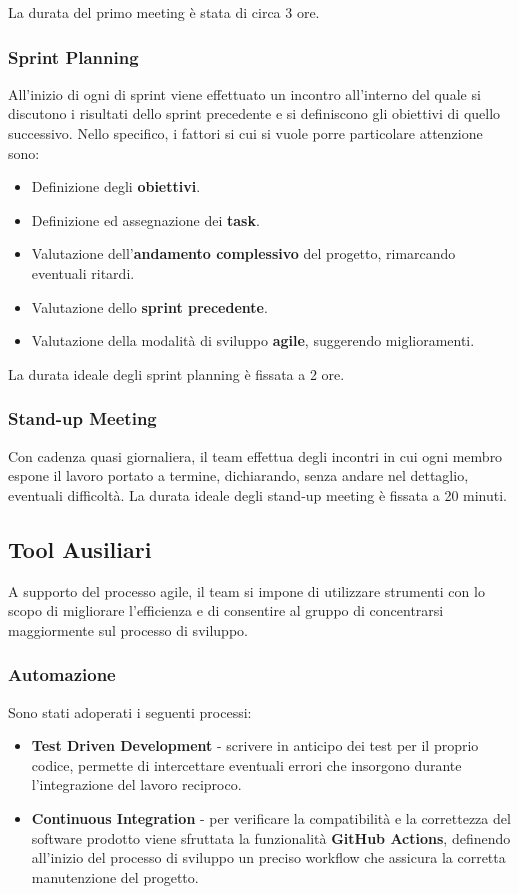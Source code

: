 La durata del primo meeting è stata di circa 3 ore.

\subsubsection{Sprint Planning}
All'inizio di ogni di sprint viene effettuato un incontro all'interno del quale si discutono i risultati dello sprint precedente e si definiscono gli obiettivi di quello successivo. Nello specifico, i fattori si cui si vuole porre particolare attenzione sono:
\begin{itemize}
    \item Definizione degli \textbf{obiettivi}.
    \item Definizione ed assegnazione dei \textbf{task}.
    \item Valutazione dell'\textbf{andamento complessivo} del progetto, rimarcando eventuali ritardi.
    \item Valutazione dello \textbf{sprint precedente}.
    \item Valutazione della modalità di sviluppo \textbf{agile}, suggerendo miglioramenti.
\end{itemize}
La durata ideale degli sprint planning è fissata a 2 ore.

\subsubsection{Stand-up Meeting}
Con cadenza quasi giornaliera, il team effettua degli incontri in cui ogni membro espone il lavoro portato a termine, dichiarando, senza andare nel dettaglio, eventuali difficoltà. La durata ideale degli stand-up meeting è fissata a 20 minuti.

\subsection{Tool Ausiliari}
A supporto del processo agile, il team si impone di utilizzare strumenti con lo scopo di migliorare l’efficienza e di consentire al gruppo di concentrarsi maggiormente sul processo di sviluppo.

\subsubsection{Automazione}
Sono stati adoperati i seguenti processi:
\begin{itemize}
    \item \textbf{Test Driven Development} - scrivere in anticipo dei test per il proprio codice, permette di intercettare eventuali errori che insorgono durante l'integrazione del lavoro reciproco.
    \item \textbf{Continuous Integration} - per verificare la compatibilità e la correttezza del software prodotto viene sfruttata la funzionalità \textbf{GitHub Actions}, definendo all'inizio del processo di sviluppo un preciso workflow che assicura la corretta manutenzione del progetto.
\end{itemize}

